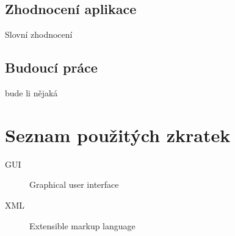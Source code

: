 \documentclass[thesis=M,czech]{FITthesis}[2014/05/07]
\begin{document}
\section{Zhodnocení aplikace}
Slovní zhodnocení
\section{Budoucí práce}
bude li nějaká

\begin{conclusion}
\end{conclusion}




\appendix

\chapter{Seznam použitých zkratek}
\begin{description}
	\item[GUI] Graphical user interface
	\item[XML] Extensible markup language
\end{description}
\end{document}
